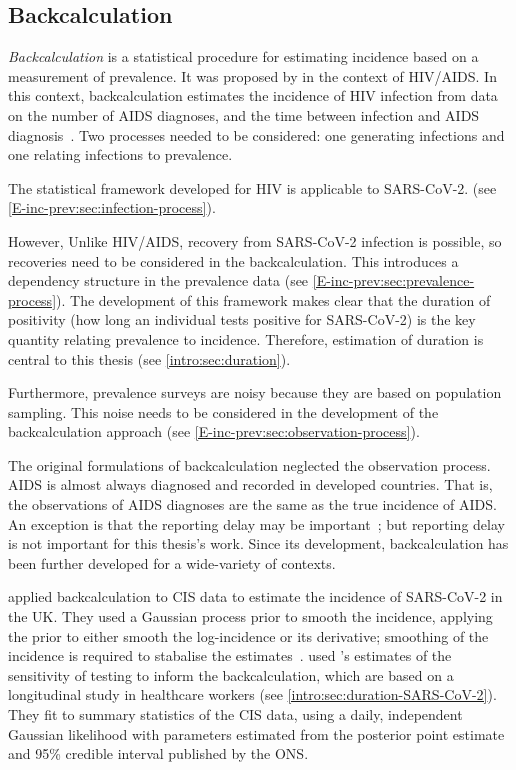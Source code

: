 \documentclass[thesis.tex]{subfiles}
\begin{document}
\subsection{Backcalculation}

\emph{Backcalculation} is a statistical procedure for estimating incidence based on a measurement of prevalence.
It was proposed by \textcite{brookmeyerMethod} in the context of HIV/AIDS.
In this context, backcalculation estimates the incidence of HIV infection from data on the number of AIDS diagnoses, and the time between infection and AIDS diagnosis~\autocite{brookmeyerBackcalculation,brookmeyerMeasuring}.
Two processes needed to be considered: one generating infections and one relating infections to prevalence.

The statistical framework developed for HIV is applicable to SARS-CoV-2.
(see \cref{E-inc-prev:sec:infection-process}).

However, Unlike HIV/AIDS, recovery from SARS-CoV-2 infection is possible, so recoveries need to be considered in the backcalculation.
This introduces a dependency structure in the prevalence data (see \cref{E-inc-prev:sec:prevalence-process}).
The development of this framework makes clear that the duration of positivity (how long an individual tests positive for SARS-CoV-2) is the key quantity relating prevalence to incidence.
Therefore, estimation of duration is central to this thesis (see \cref{intro:sec:duration}).

Furthermore, prevalence surveys are noisy because they are based on population sampling.
This noise needs to be considered in the development of the backcalculation approach (see \cref{E-inc-prev:sec:observation-process}).

The original formulations of backcalculation neglected the observation process.
AIDS is almost always diagnosed and recorded in developed countries.
That is, the observations of AIDS diagnoses are the same as the true incidence of AIDS.
An exception is that the reporting delay may be important~\autocite{paganoHIV}; but reporting delay is not important for this thesis's work.
Since its development, backcalculation has been further developed for a wide-variety of contexts.

\Textcite{abbottCISincidence} applied backcalculation to CIS data to estimate the incidence of SARS-CoV-2 in the UK.
They used a Gaussian process prior to smooth the incidence, applying the prior to either smooth the log-incidence or its derivative; smoothing of the incidence is required to stabalise the estimates~\autocite{brookmeyerBackcalculation}.
\Textcite{abbottCISincidence} used \textcite{hellewellPCRSensitivity}'s estimates of the sensitivity of testing to inform the backcalculation, which are based on a longitudinal study in healthcare workers (see \cref{intro:sec:duration-SARS-CoV-2}).
They fit to summary statistics of the CIS data, using a daily, independent Gaussian likelihood with parameters estimated from the posterior point estimate and 95\% credible interval published by the ONS.
\end{document}
